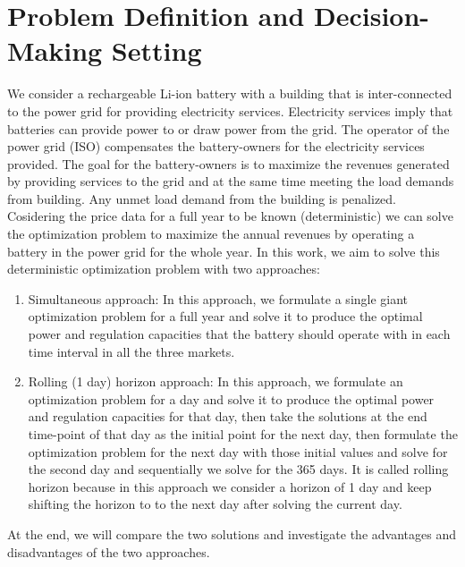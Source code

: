\documentclass[11pt,twoside]{article}
\begin{document}
\section{Problem Definition and Decision-Making Setting}\label{sec:setting}
We consider a rechargeable Li-ion battery with a building that is inter-connected to the power grid for providing electricity services. Electricity services imply that batteries can provide power to or draw power from the grid. The operator of the power grid (ISO) compensates the battery-owners for the electricity services provided. The goal for the battery-owners is to maximize the revenues generated by providing services to the grid and at the same time meeting the load demands from building. Any unmet load demand from the building is penalized.\\
Cosidering the price data for a full year to be known (deterministic) we can solve the optimization problem to maximize the annual revenues by operating a battery in the power grid for the whole year. In this work, we aim to solve this deterministic optimization problem with two approaches:
\begin{enumerate}
\item Simultaneous approach: In this approach, we formulate a single giant optimization problem for a full year and solve it to produce the optimal power and regulation capacities that the battery should operate with in each time interval in all the three markets. 
\item Rolling (1 day) horizon approach: In this approach, we formulate an optimization problem for a day and solve it to produce the optimal power and regulation capacities for that day, then take the solutions at the end time-point of that day as the initial point for the next day, then formulate the optimization problem for the next day with those initial values and solve for the second day and sequentially we solve for the 365 days. It is called rolling horizon because in this approach we consider a horizon of 1 day and keep shifting the horizon to to the next day after solving the current day.
\end{enumerate}

At the end, we will compare the two solutions and investigate the advantages and disadvantages of the two approaches.
\end{document}
